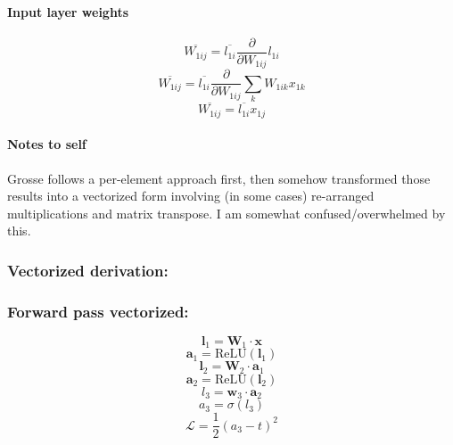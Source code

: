 \documentclass{article}
\begin{document}
\paragraph{Input layer weights}
\[\overline{W_{1ij}} = \overline{l_{1i}} \frac{\partial}{\partial{W_{1ij}}} l_{1i}\]
\[\overline{W_{1ij}} = \overline{l_{1i}} \frac{\partial}{\partial{W_{1ij}}} \sum_{k} W_{1ik}x_{1k}\]
\begin{equation}
    \overline{W_{1ij}} = \overline{l_{1i}} x_{1j}
\end{equation}

\paragraph{Notes to self} Grosse follows a per-element approach first, then somehow transformed
those results into a vectorized form involving (in some cases) re-arranged 
multiplications and matrix transpose. I am somewhat confused/overwhelmed by this. 
\subsubsection{Vectorized derivation:}
\subsubsection{Forward pass vectorized:}
\[\bm{l}_1 = \bm{W}_1 \cdot \bm{x} \]
\[\bm{a}_1 = \text{ReLU}(\bm{l}_1) \]
\[\bm{l}_2 = \bm{W}_2 \cdot \bm{a}_1\]
\[\bm{a}_2 = \text{ReLU}(\bm{l}_2)\]
\[l_3 = \bm{w}_3 \cdot \bm{a}_2\]
\[a_3 = \sigma(l_3)\]
\[\mathcal{L} = \frac{1}{2}(a_3-t)^2\]
\end{document}
